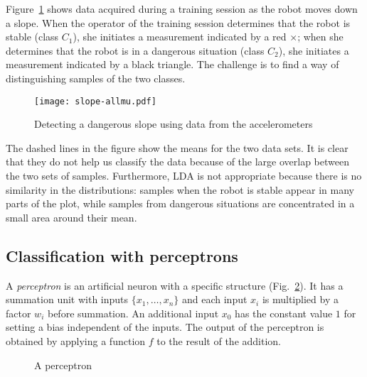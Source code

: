Figure~\ref{fig.slopemes} shows data acquired during a training session as the robot moves down a slope. When the operator of the training session determines that the robot is stable (class $C_1$), she initiates a measurement indicated by a red $\times$; when she determines that the robot is in a dangerous situation (class $C_2$), she initiates a measurement indicated by a black triangle. The challenge is to find a way of distinguishing samples of the two classes.

\begin{figure}
\begin{center}
\texttt{[image: slope-allmu.pdf]}
\end{center}
\caption{Detecting a dangerous slope using data from the accelerometers}\label{fig.slopemes}
\end{figure}

The dashed lines in the figure show the means for the two data sets. It is clear that they do not help us classify the data because of the large overlap between the two sets of samples. Furthermore, LDA is not appropriate because there is no similarity in the distributions: samples when the robot is stable appear in many parts of the plot, while samples from dangerous situations are concentrated in a small area around their mean.

\subsection{Classification with perceptrons}

A \emph{perceptron} is an artificial neuron with a specific structure (Fig.~\ref{fig.perceptron}). It has a summation unit with inputs $\{x_1,\ldots,x_n\}$ and each input $x_i$ is multiplied by a factor $w_i$ before summation. An additional input $x_0$ has the constant value $1$ for setting a bias independent of the inputs. The output of the perceptron is obtained by applying a function $f$ to the result of the addition.

\begin{figure}
\begin{center}
\end{center}
\caption{A perceptron}\label{fig.perceptron}
\end{figure}

